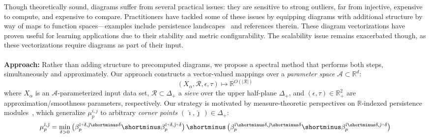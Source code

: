 \documentclass[10pt twocolumn]{article}
\numberwithin{equation}{section}
\newcommand{\+}{%
	\raisebox{0.18ex}{\scaleobj{0.55}{+}}
}
\theoremstyle{definition}
\theoremstyle{definition}
\begin{document}
\begin{multicols}{2}
Though theoretically sound, diagrams suffer from several practical issues: they are sensitive to strong outliers, far from injective, expensive to compute, and expensive to compare. 
Practitioners have tackled some of these issues by equipping diagrams with additional structure by way of maps to function spaces---examples include persistence landscapes~\cite{bubenik2015statistical} and references therein. 
These diagram vectorizations have proven useful for learning applications due to their stability and  metric configurability.
The scalability issue remains exacerbated though, as these vectorizations require diagrams as part of their input. %
\\
\\
\noindent \textbf{Approach:}
Rather than adding structure to precomputed diagrams, we propose a spectral method that performs both steps, simultaneously and approximately. 
Our approach constructs a vector-valued mappings over a \emph{parameter space} $\mathcal{A} \subset \mathbb{R}^d$: 
\begin{equation*}\label{eq:relaxation_mapping}
	(X_\alpha, \mathcal{R}, \epsilon, \tau) \mapsto \mathbb{R}^{O(\lvert \mathcal{R} \rvert)}
\end{equation*}
where $X_\alpha$ is an $\mathcal{A}$-parameterized input data set, $\mathcal{R} \subset \Delta_+$ a \emph{sieve} over the upper half-plane $\Delta_+$, and $(\epsilon, \tau) \in \mathbb{R}_+^2$ are approximation/smoothness parameters, respectively.
Our strategy is motivated by measure-theoretic perspectives on $\mathbb{R}$-indexed persistence modules~\cite{cerri2013betti, chazal2016structure}, which generalize $\mu_p^{i,j}$ to arbitrary \emph{corner points} $(\, \hat\imath, \hat\jmath \,) \in \Delta_+$:
\begin{multline*}\label{eq:measure}
\mu_p^{\hat\imath, \hat\jmath} = \min_{\delta > 0} \left(\beta_p^{\hat\imath \+ \delta, \hat\jmath \shortminus \delta} \shortminus \beta_p^{\hat\imath \+ \delta, \hat\jmath  \+ \delta} \right) \shortminus \left(\beta_p^{\hat\imath \shortminus \delta, \hat\jmath \shortminus \delta} \shortminus \beta_p^{\hat\imath \shortminus \delta, \hat\jmath  \+ \delta} \right)

\end{multline*}
\end{multicols}
\end{document}
